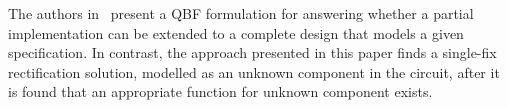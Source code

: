 The authors in~\cite{scholl:2} present a QBF 
formulation for answering whether a partial implementation can be extended 
to a complete design that models a given specification. In contrast, the approach 
presented in this paper finds a single-fix rectification solution,
modelled as an unknown component in the circuit, after it is found
that an appropriate function for unknown component exists. 



 
